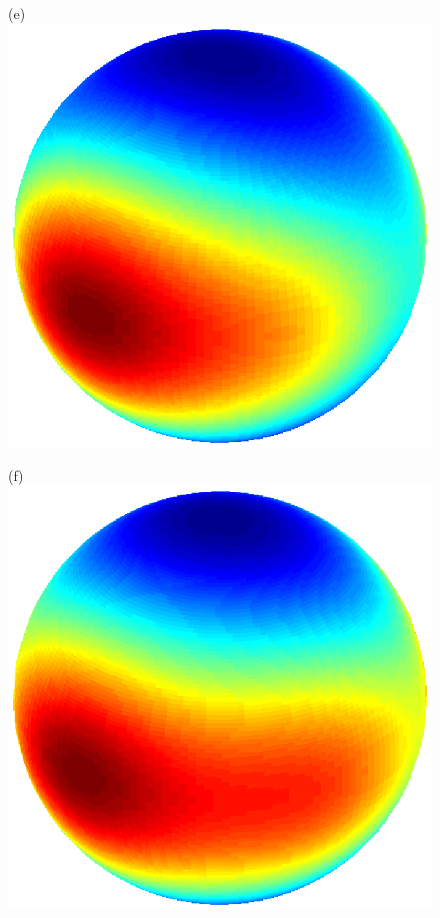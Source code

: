 \documentclass[dvips,aoas,preprint]{imsart}
\numberwithin{equation}{section}
\theoremstyle{plain}
\begin{document}
\begin{figure}[!htbp]
\begin{minipage}[]{0.12\textwidth}
    \end{minipage}
    \begin{minipage}[]{0.12\textwidth}
      \centering
      (e)
      \includegraphics*[width=\textwidth]{figure1h1.eps}
    \end{minipage}
    \begin{minipage}[]{0.12\textwidth}
      \centering
      (f)
      \includegraphics*[width=\textwidth]{figure1i1.eps}

\end{minipage}
\end{figure}
\end{document}
